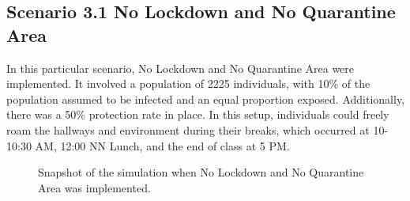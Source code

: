 \subsection{ Scenario 3.1 No Lockdown and No Quarantine Area}
\label{3.1b}

In this particular scenario, No Lockdown and No Quarantine Area were implemented. It involved a population of 2225 individuals, with 10\% of the population assumed to be infected and an equal proportion exposed. Additionally, there was a 50\% protection rate in place. In this setup, individuals could freely roam the hallways and environment during their breaks, which occurred at 10-10:30 AM, 12:00 NN Lunch, and the end of class at 5 PM.

\begin{figure}[H]
	\centering
	\subfigure[Snapshot of the simulation during break time]
	{\texttt{[image: images/3.1a.png]}
	\label{break}}
\quad
{}

\caption{Snapshot of the simulation when No Lockdown and No Quarantine Area was implemented.}
\label{fig:figures}
\end{figure}

